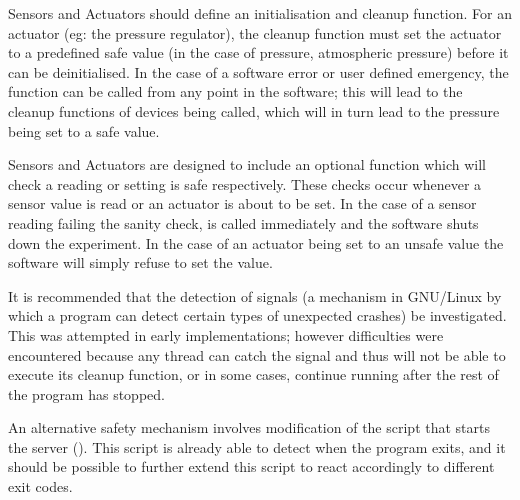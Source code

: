 Sensors and Actuators should define an initialisation and cleanup function. For an actuator (eg: the pressure regulator), the cleanup function must set the actuator to a predefined safe value (in the case of pressure, atmospheric pressure) before it can be deinitialised. In the case of a software error or user defined emergency, the  function can be called from any point in the software; this will lead to the cleanup functions of devices being called, which will in turn lead to the pressure being set to a safe value. 

Sensors and Actuators are designed to include an optional  function which will check a reading or setting is safe respectively. These checks occur whenever a sensor value is read or an actuator is about to be set. In the case of a sensor reading failing the sanity check,  is called immediately and the software shuts down the experiment. In the case of an actuator being set to an unsafe value the software will simply refuse to set the value.

It is recommended that the detection of signals (a mechanism in GNU/Linux by which a program can detect certain types of unexpected crashes) be investigated. This was attempted in early implementations; however difficulties were encountered because any thread can catch the signal and thus will not be able to execute its cleanup function, or in some cases, continue running after the rest of the program has stopped.

An alternative safety mechanism involves modification of the script that starts the server (). This script is already able to detect when the program exits, and it should be possible to further extend this script to react accordingly to different exit codes.

